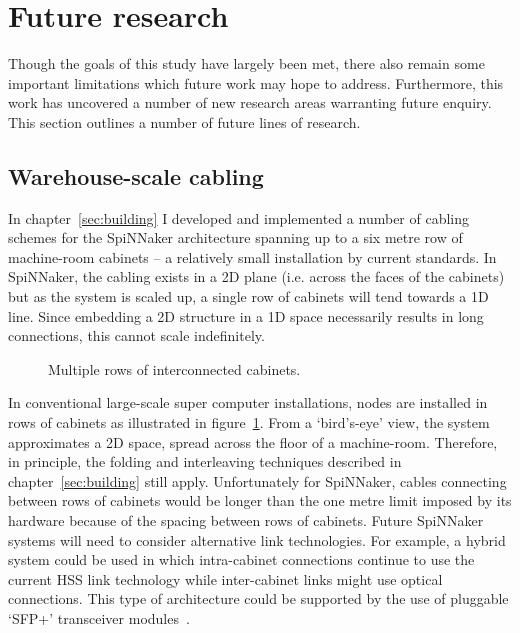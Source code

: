 	\section{Future research}
		
		Though the goals of this study have largely been met, there also remain
		some important limitations which future work may hope to address.
		Furthermore, this work has uncovered a number of new research areas
		warranting future enquiry. This section outlines a number of future lines
		of research.
		
		\subsection{Warehouse-scale cabling}
			
			In chapter~\ref{sec:building} I developed and implemented a number of
			cabling schemes for the SpiNNaker architecture spanning up to a six metre
			row of machine-room cabinets -- a relatively small installation by
			current standards. In SpiNNaker, the cabling exists in a 2D plane (i.e.
			across the faces of the cabinets) but as the system is scaled up, a
			single row of cabinets will tend towards a 1D line. Since embedding a 2D
			structure in a 1D space necessarily results in long connections, this
			cannot scale indefinitely.
			
			\begin{figure}
				\center
				
				\caption{Multiple rows of interconnected cabinets.}
				\label{fig:multi-row-cabling}
			\end{figure}
			
			In conventional large-scale super computer installations, nodes are
			installed in rows of cabinets as illustrated in
			figure~\ref{fig:multi-row-cabling}.  From a `bird's-eye' view, the system
			approximates a 2D space, spread across the floor of a machine-room.
			Therefore, in principle, the folding and interleaving techniques
			described in chapter~\ref{sec:building} still apply. Unfortunately for
			SpiNNaker, cables connecting between rows of cabinets would be longer
			than the one metre limit imposed by its hardware because of the spacing
			between rows of cabinets.  Future SpiNNaker systems will need to consider
			alternative link technologies.  For example, a hybrid system could be
			used in which intra-cabinet connections continue to use the current HSS
			link technology while inter-cabinet links might use optical connections.
			This type of architecture could be supported by the use of pluggable
			`SFP+' transceiver modules~\cite{sff01}.
		
